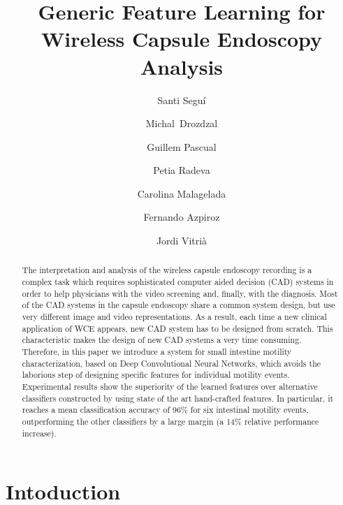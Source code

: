 \documentclass[review,12pt,3p]{elsarticle}
\begin{document}
\title{Generic Feature Learning for Wireless Capsule Endoscopy Analysis}

\author[label1,label2]{Santi Segu\'i}
\address[label1]{Dept. Matem\`atica Aplicada i An\`alisi, Universitat de Barcelona, Barcelona}
\address[label2]{Computer Vision Center (CVC), Barcelona, Spain}


\author[label5]{Michal~Drozdzal}
\address[label5]{Medtronic GI, Yoqneam, Israel}

\author[label1]{Guillem Pascual}
\author[label1,label2]{Petia Radeva}
\author[label3]{Carolina Malagelada}
\address[label3]{Digestive System Research Unit, Hospital Vall d'Hebron, Barcelona, Spain}
\author[label3]{Fernando Azpiroz}
\author[label1,label2]{Jordi Vitri\`a}




\maketitle

\begin{abstract}
The interpretation and analysis of the wireless capsule endoscopy recording is a complex task which requires sophisticated computer aided decision (CAD) systems in order to help physicians with the video screening and, finally, with the diagnosis. Most of the CAD systems in the capsule endoscopy share a common system design, but use very different image and video representations. As a result, each time a new clinical application of WCE appears, new CAD system has to be designed from scratch. This characteristic makes the design of new CAD systems a very time consuming. Therefore, in this paper we introduce a system for small intestine motility characterization, based on Deep Convolutional Neural Networks, which avoids the laborious step of designing specific features for individual motility events. Experimental results show the superiority of the learned features over alternative classifiers constructed by using state of the art hand-crafted features. In particular, it reaches a mean classification accuracy of 96\% for six intestinal motility events, outperforming the other classifiers by a large margin (a 14\% relative performance increase).

\end{abstract}



\section{Intoduction}
\label{secIntro}
\end{document}
